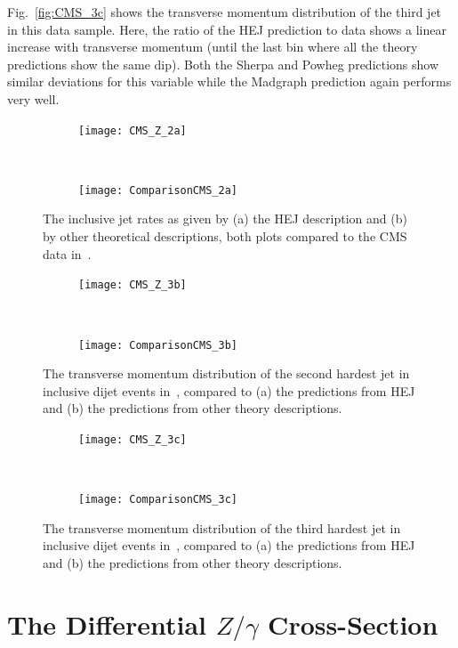 			Fig.~\eqref{fig:CMS_3c} shows the transverse momentum distribution of the third
			jet in this data sample.  Here, the ratio of the HEJ prediction to data shows a
			linear increase with transverse momentum (until the last bin where all the
			theory predictions show the same dip).  Both the Sherpa and Powheg predictions
			show similar deviations for this variable while the Madgraph prediction again
			performs very well.


			\begin{figure}[h]
			  \centering
			  \begin{subfigure}[b]{0.46\textwidth}
			    \texttt{[image: CMS\_Z\_2a]}
			    \caption{}
			    \label{fig:HEJ_CMS_2a}
			  \end{subfigure}
			  ~
			  \begin{subfigure}[b]{0.48\textwidth}
			    \texttt{[image: ComparisonCMS\_2a]}
			    \caption{}
			    \label{fig:MC_CMS_2a}
			  \end{subfigure}
			  \caption{The inclusive jet rates as given by (a) the HEJ description and (b)
			    by other theoretical descriptions, both plots compared to the CMS data in~\cite{Khachatryan:2014zya}.}
			  \label{fig:CMS_2a}

			  \begin{subfigure}[b]{0.46\textwidth}
			    \texttt{[image: CMS\_Z\_3b]}
			    \caption{}
			    \label{fig:HEJ_CMS_7b}
			  \end{subfigure}
			  ~
			  \begin{subfigure}[b]{0.48\textwidth}
			    \texttt{[image: ComparisonCMS\_3b]}
			    \caption{}
			    \label{fig:MC_CMS_7b}
			  \end{subfigure}
			  \caption{The transverse momentum distribution of the second hardest jet in
			    inclusive dijet events in~\cite{Khachatryan:2014zya}, compared to (a) the
			    predictions from HEJ and (b) the predictions from other theory descriptions.}
			  \label{fig:CMS_3b}
			\end{figure}

			\begin{figure}[H]
			  \centering
			  \begin{subfigure}[b]{0.46\textwidth}
			    \texttt{[image: CMS\_Z\_3c]}
			    \caption{}
			    \label{fig:HEJ_CMS_7b}
			  \end{subfigure}
			  ~
			  \begin{subfigure}[b]{0.48\textwidth}
			    \texttt{[image: ComparisonCMS\_3c]}
			    \caption{}
			    \label{fig:MC_CMS_7b}
			  \end{subfigure}
			  \caption{The transverse momentum distribution of the third hardest jet in
			    inclusive dijet events in~\cite{Khachatryan:2014zya}, compared to (a) the
			    predictions from HEJ and (b) the predictions from other theory descriptions.}
			  \label{fig:CMS_3c}
			\end{figure}

\section{The Differential ${Z/\gamma}$ Cross-Section}

